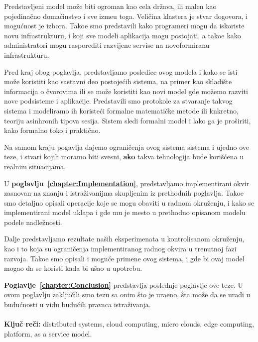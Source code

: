 Predstavljeni model mo\v ze biti ogroman kao cela dr\v zava, ili malen kao pojedina\v cno doma\'cinstvo i sve izme\dj u toga. Veli\v cina klastera je stvar dogovora, i mogu\'cnost je  izbora. Tako\dj e smo predstavili kako programeri mogu da iskoriste novu infrastrukturu, i koji sve modeli aplikacija mogu postojati, a tako\dj e kako administratori mogu rasporediti razvijene servise na novoformiranu infrastrukturu.

Pred kraj obog poglavlja, predstavljamo posledice ovog modela i kako se isti mo\v ze koristiti kao sastavni deo postoje\'cih sistema, na primer kao skladište informacija o \v cvorovima ili se mo\v ze koristiti kao novi model gde mo\v zemo razviti nove podsisteme i aplikacije. Predstavili smo protokole za stvaranje takvog sistema i modeliramo ih koriste\'ci formalne matemati\v cke metode ili knkretno, teoriju asinhronih tipova sesija. Sistem sledi formalni model i lako ga je pro\v siriti, kako formalno toko i prakti\v cno.

Na samom kraju pogavlja dajemo ograni\v cenja ovog sistema sistema i ujedno ove teze, i stvari kojih moramo biti svesni, \textbf{ako} takva tehnologija bude kori\v s\'cena u realnim situacijama.

U \textbf{poglavlju~\ref{chapter:Implementation}}, predstavljamo implementirani okvir zasnovan na znanju i istra\v zivanijma skupljenim iz prethodnih poglavlja. Tako\dj e smo detaljno opisali operacije koje se mogu obaviti u radnom okru\v zenju, i kako se implementirani model uklapa i gde mu je mesto u prethodno opisanom modelu podele nadle\v znosti.

Dalje predstavljamo rezultate na\v sih eksperimenata u kontrolisanom okru\v zenju, kao i to koja su ograni\v cenja implementiranog radnog okvira u trenutnoj fazi razvoja. Tako\dj e smo opisali i mogu\'ce primene ovog sistema, i gde bi ovaj model mogao da se koristi kada bi u\v sao u upotrebu.

\textbf{Poglavlje~\ref{chapter:Conclusion}} predstavlja poslednje poglavlje ove teze. U ovom poglavlju zaklju\v cili smo tezu sa onim što je ura\dj eno, \v sta mo\v ze da se uradi u budu\'cnosti u vidu budu\'cih pravaca istra\v zivanja.\\\\

\noindent
\textbf{Klju\v c re\v ci:} distributed systems, cloud computing, micro clouds, edge computing, platform, as a service model.
